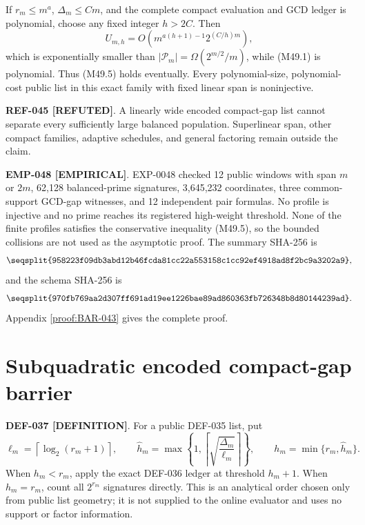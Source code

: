 \documentclass[11pt]{article}
\newcommand{\claimstatus}[2]{\textbf{#1 [#2]}}
\begin{document}
If \(r_m\le m^a\), \(\Delta_m\le Cm\), and the complete compact evaluation
and GCD ledger is polynomial, choose any fixed integer \(h>2C\). Then
\[
U_{m,h}
=O\!\left(m^{a(h+1)-1}2^{(C/h)m}\right),
\]
which is exponentially smaller than
\(|\mathcal P_m|=\Omega(2^{m/2}/m)\), while (M49.1) is polynomial.
Thus (M49.5) holds eventually. Every polynomial-size, polynomial-cost public
list in this exact family with fixed linear span is noninjective.

\claimstatus{REF-045}{REFUTED}. A linearly wide encoded compact-gap list
cannot separate every sufficiently large balanced population. Superlinear
span, other compact families, adaptive schedules, and general factoring
remain outside the claim.

\claimstatus{EMP-048}{EMPIRICAL}. EXP-0048 checked 12 public windows with
span \(m\) or \(2m\), 62,128 balanced-prime signatures, 3,645,232
coordinates, three common-support GCD-gap witnesses, and 12 independent pair
formulas. No profile is injective and no prime reaches its registered
high-weight threshold. None of the finite profiles satisfies the conservative
inequality (M49.5), so the bounded collisions are not used as the asymptotic
proof. The summary SHA-256 is
\[
\texttt{\seqsplit{958223f09db3abd12b46fcda81cc22a553158c1cc92ef4918ad8f2bc9a3202a9}},
\]
and the schema SHA-256 is
\[
\texttt{\seqsplit{970fb769aa2d307ff691ad19ee1226bae89ad860363fb726348b8d80144239ad}}.
\]
Appendix \ref{proof:BAR-043} gives the complete proof.

\section{Subquadratic encoded compact-gap barrier}

\claimstatus{DEF-037}{DEFINITION}. For a public DEF-035 list, put
\[
\ell_m=\left\lceil\log_2(r_m+1)\right\rceil,\qquad
\widehat h_m=
\max\left\{1,
\left\lceil\sqrt{\frac{\Delta_m}{\ell_m}}\right\rceil
\right\},
\qquad
h_m=\min\{r_m,\widehat h_m\}.
\tag{M51.1}
\]
When \(h_m<r_m\), apply the exact DEF-036 ledger at threshold \(h_m+1\).
When \(h_m=r_m\), count all \(2^{r_m}\) signatures directly. This is an
analytical order chosen only from public list geometry; it is not supplied
to the online evaluator and uses no support or factor information.
\end{document}
